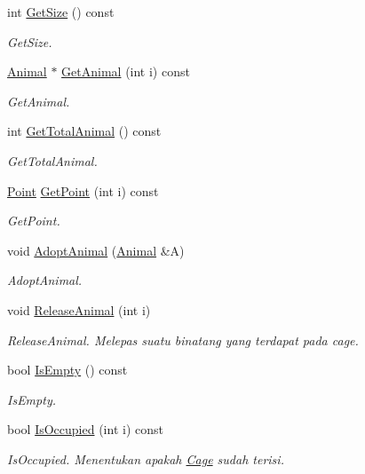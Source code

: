 \begin{DoxyCompactItemize}
int \hyperlink{classCage_abf801136c687ea862b64d0c36a2ce5cd}{Get\+Size} () const 
\begin{DoxyCompactList}\small\item\em Get\+Size. \end{DoxyCompactList}\item 
\hyperlink{classAnimal}{Animal} $\ast$ \hyperlink{classCage_a3d094c1b97eaab68f5ca407bcd0099b6}{Get\+Animal} (int i) const 
\begin{DoxyCompactList}\small\item\em Get\+Animal. \end{DoxyCompactList}\item 
int \hyperlink{classCage_a49312121ccca0c0b731f3fe1256a28a2}{Get\+Total\+Animal} () const 
\begin{DoxyCompactList}\small\item\em Get\+Total\+Animal. \end{DoxyCompactList}\item 
\hyperlink{classPoint}{Point} \hyperlink{classCage_ae01123979c931296ca477d9d15d9efba}{Get\+Point} (int i) const 
\begin{DoxyCompactList}\small\item\em Get\+Point. \end{DoxyCompactList}\item 
void \hyperlink{classCage_ab0756fb25bac61d39e25a12f96e4769a}{Adopt\+Animal} (\hyperlink{classAnimal}{Animal} \&A)
\begin{DoxyCompactList}\small\item\em Adopt\+Animal. \end{DoxyCompactList}\item 
void \hyperlink{classCage_a84c0aac0bfd315ef7e5d0595dea5be5a}{Release\+Animal} (int i)
\begin{DoxyCompactList}\small\item\em Release\+Animal. Melepas suatu binatang yang terdapat pada cage. \end{DoxyCompactList}\item 
bool \hyperlink{classCage_a8f2321f5ca7e5fed271350ea1800e10b}{Is\+Empty} () const 
\begin{DoxyCompactList}\small\item\em Is\+Empty. \end{DoxyCompactList}\item 
bool \hyperlink{classCage_aafb5de9009a7ef80fc039f27793c8df6}{Is\+Occupied} (int i) const 
\begin{DoxyCompactList}\small\item\em Is\+Occupied. Menentukan apakah \hyperlink{classCage}{Cage} sudah terisi. \end{DoxyCompactList}\item 

\end{DoxyCompactItemize}
